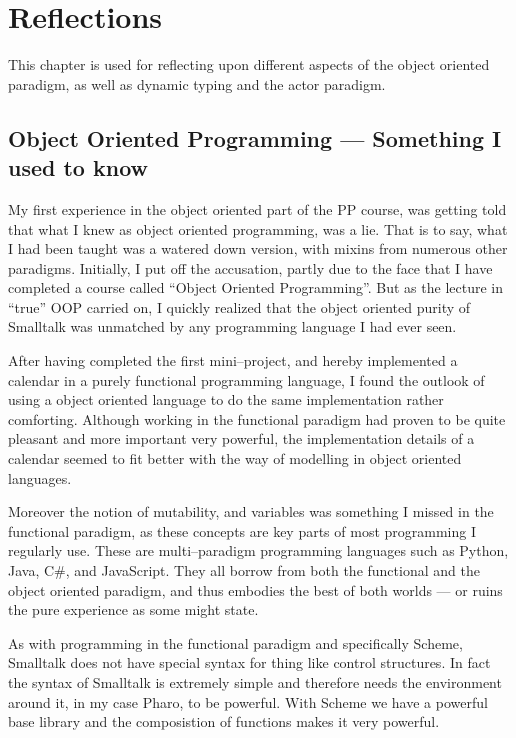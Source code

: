 \chapter{Reflections}
This chapter is used for reflecting upon different aspects of the object oriented paradigm, as well as dynamic typing and the actor paradigm.

\section{Object Oriented Programming --- Something I used to know}
My first experience in the object oriented part of the PP course, was getting told that what I knew as object oriented programming, was a lie.
That is to say, what I had been taught was a watered down version, with mixins from numerous other paradigms.
Initially, I put off the accusation, partly due to the face that I have completed a course called \enquote{Object Oriented Programming}.
But as the lecture in \enquote{true} OOP carried on, I quickly realized that the object oriented purity of Smalltalk was unmatched by any programming language I had ever seen.

\bigskip
After having completed the first mini--project, and hereby implemented a calendar in a purely functional programming language,
I found the outlook of using a object oriented language to do the same implementation rather comforting.
Although working in the functional paradigm had proven to be quite pleasant and more important very powerful,
the implementation details of a calendar seemed to fit better with the way of modelling in object oriented languages.

Moreover the notion of mutability, and variables was something I missed in the functional paradigm, as these concepts are key parts of most programming I regularly use.
These are multi--paradigm programming languages such as Python, Java, C\#, and JavaScript.
They all borrow from both the functional and the object oriented paradigm, and thus embodies the best of both worlds --- or ruins the pure experience as some might state.

\bigskip
As with programming in the functional paradigm and specifically Scheme, Smalltalk does not have special syntax for thing like control structures.
In fact the syntax of Smalltalk is extremely simple and therefore needs the environment around it, in my case Pharo, to be powerful.
With Scheme we have a powerful base library and the composistion of functions makes it very powerful.

